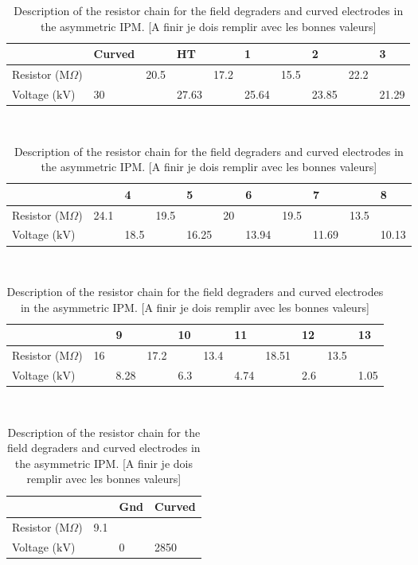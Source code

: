\begin{table}[ht]
  \noindent
  \caption[Description of the resistor chain for the field degraders and curved electrodes in the asymmetric IPM]
  {Description of the resistor chain for the field degraders and curved electrodes in the asymmetric IPM. [A finir je dois remplir avec les bonnes valeurs]}
  \label{chap3:resistor_asym}
  \begin{tabular}{llllllllll}
    \toprule
                                    & Curved &      & HT    &      & 1     &      & 2    &      & 3    \\
    \midrule
    Resistor (\(\mathrm{M}\Omega\)) &        & 20.5 &       & 17.2 &       & 15.5 &      & 22.2        \\
    Voltage (\(\mathrm{kV}\))       & 30     &      & 27.63 &      & 25.64 &      & 23.85 &      & 21.29 \\
    \bottomrule
  \end{tabular}
  \\
  \medskip
  \begin{tabular}{lllllllllll}
    \toprule
                           &      & 4  &      & 5  &    & 6  &      & 7  &      & 8  \\
    \midrule
    Resistor (\(\mathrm{M}\Omega\)) & 24.1 &    & 19.5 &    & 20 &    & 19.5 &    & 13.5      \\
    Voltage (\(\mathrm{kV}\))       &      & 18.5 &      & 16.25 &    & 13.94 &      & 11.69 &      & 10.13 \\
    \bottomrule
  \end{tabular}
  \\
  \medskip
  \begin{tabular}{lllllllllll}
    \toprule
                           &    & 9  &      & 10 &      & 11 &       & 12 &      & 13 \\
    \midrule
    Resistor (\(\mathrm{M}\Omega\)) & 16 &    & 17.2 &    & 13.4 &    & 18.51 &    & 13.5      \\
    Voltage (\(\mathrm{kV}\))       &    & 8.28 &      & 6.3 &      & 4.74 &       & 2.6 &      & 1.05 \\
    \bottomrule
  \end{tabular}
  \\
  \medskip
  \begin{tabular}{llll}
    \toprule
                           &     & Gnd & Curved \\
    \midrule
    Resistor (\(\mathrm{M}\Omega\)) & 9.1 &     &        \\
    Voltage (\(\mathrm{kV}\))       &     & 0  & 2850      \\
    \bottomrule
  \end{tabular}

\end{table}